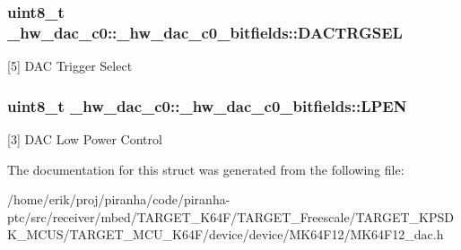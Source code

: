 \subsubsection[{\texorpdfstring{D\+A\+C\+T\+R\+G\+S\+EL}{DACTRGSEL}}]{\setlength{\rightskip}{0pt plus 5cm}uint8\+\_\+t \+\_\+hw\+\_\+dac\+\_\+c0\+::\+\_\+hw\+\_\+dac\+\_\+c0\+\_\+bitfields\+::\+D\+A\+C\+T\+R\+G\+S\+EL}\hypertarget{struct__hw__dac__c0_1_1__hw__dac__c0__bitfields_a373f677b675a01324f4220bf0fb46090}{}\label{struct__hw__dac__c0_1_1__hw__dac__c0__bitfields_a373f677b675a01324f4220bf0fb46090}
\mbox{[}5\mbox{]} D\+AC Trigger Select 
\subsubsection[{\texorpdfstring{L\+P\+EN}{LPEN}}]{\setlength{\rightskip}{0pt plus 5cm}uint8\+\_\+t \+\_\+hw\+\_\+dac\+\_\+c0\+::\+\_\+hw\+\_\+dac\+\_\+c0\+\_\+bitfields\+::\+L\+P\+EN}\hypertarget{struct__hw__dac__c0_1_1__hw__dac__c0__bitfields_ab9711ff5a04e09b7e30ab276f2c0de20}{}\label{struct__hw__dac__c0_1_1__hw__dac__c0__bitfields_ab9711ff5a04e09b7e30ab276f2c0de20}
\mbox{[}3\mbox{]} D\+AC Low Power Control 

The documentation for this struct was generated from the following file\+:\begin{DoxyCompactItemize}
\item 
/home/erik/proj/piranha/code/piranha-\/ptc/src/receiver/mbed/\+T\+A\+R\+G\+E\+T\+\_\+\+K64\+F/\+T\+A\+R\+G\+E\+T\+\_\+\+Freescale/\+T\+A\+R\+G\+E\+T\+\_\+\+K\+P\+S\+D\+K\+\_\+\+M\+C\+U\+S/\+T\+A\+R\+G\+E\+T\+\_\+\+M\+C\+U\+\_\+\+K64\+F/device/device/\+M\+K64\+F12/M\+K64\+F12\+\_\+dac.\+h\end{DoxyCompactItemize}
